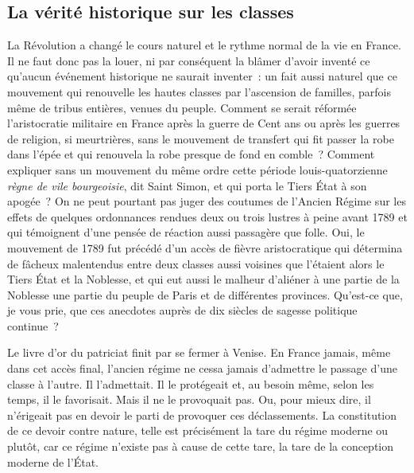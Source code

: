 \documentclass[french,twoside]{book} %
\newcommand{\astermono}{\medskip\centerline{\color{rubric}\large\selectfont{\syms ✻}}\medskip\par}%
\begin{document}
\astermono

\subsection[La vérité historique sur les classes]{La vérité historique sur les classes}
\noindent La Révolution a changé le cours naturel et le rythme normal de la vie en France. Il ne faut donc pas la louer, ni par conséquent la blâmer d’avoir inventé ce qu’aucun événement historique ne saurait inventer : un fait aussi naturel que ce mouvement qui renouvelle les hautes classes par l’ascension de familles, parfois même de tribus entières, venues du peuple. Comment se serait réformée l’aristocratie militaire en France après la guerre de Cent ans ou après les guerres de religion, si meurtrières, sans le mouvement de transfert qui fit passer la robe dans l’épée et qui renouvela la robe presque de fond en comble ? Comment expliquer sans un mouvement du même ordre cette période louis-quatorzienne \emph{règne de vile bourgeoisie}, dit Saint Simon, et qui porta le Tiers État à son apogée ? On ne peut pourtant pas juger des coutumes de l’Ancien Régime sur les effets de quelques ordonnances rendues deux ou trois lustres à peine avant 1789 et qui témoignent d’une pensée de réaction aussi passagère que folle. Oui, le mouvement de 1789 fut précédé d’un accès de fièvre aristocratique qui détermina de fâcheux malentendus entre deux classes aussi voisines que l’étaient alors le Tiers État et la Noblesse, et qui eut aussi le malheur d’aliéner à une partie de la Noblesse une partie du peuple de Paris et de différentes provinces. Qu’est-ce que, je vous prie, que ces anecdotes auprès de dix siècles de sagesse politique continue ?\par

\astermono

\noindent Le livre d’or du patriciat finit par se fermer à Venise. En France jamais, même dans cet accès final, l’ancien régime ne cessa jamais d’admettre le passage d’une classe à l’autre. Il l’admettait. Il le protégeait et, au besoin même, selon les temps, il le favorisait. Mais il ne le provoquait pas. Ou, pour mieux dire, il n’érigeait pas en devoir le parti de provoquer ces déclassements. La constitution de ce devoir contre nature, telle est précisément la tare du régime moderne ou plutôt, car ce régime n’existe pas à cause de cette tare, la tare de la conception moderne de l’État.\par

\astermono
\end{document}
